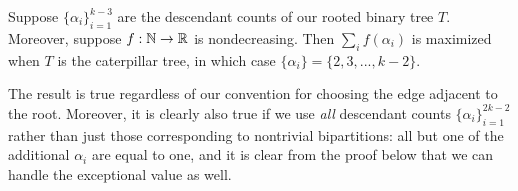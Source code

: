 \begin{lemma}
\label{lem:caterpillar_maximize_increasing_sums}
Suppose $\{\alpha_{i}\}_{i=1}^{k-3}$ are the descendant counts of our rooted binary tree $T$. Moreover, suppose $f: \mathbb{N} \to \mathbb{R}$ is nondecreasing. Then $\sum_i f(\alpha_{i})$ is maximized when $T$ is the caterpillar tree, in which case $\{\alpha_{i}\} = \{2,3,..., k-2\}$.

\end{lemma}

\noindent The result is true regardless of our convention for choosing the edge adjacent to the root.
Moreover, it is clearly also true if we use \textit{all} descendant counts
$\{\alpha_i\}_{i=1}^{2k-2}$ rather than just those corresponding to nontrivial bipartitions:
all but one of the additional $\alpha_i$ are equal to one, and it is clear from the proof below
that we can handle the exceptional value as well.

